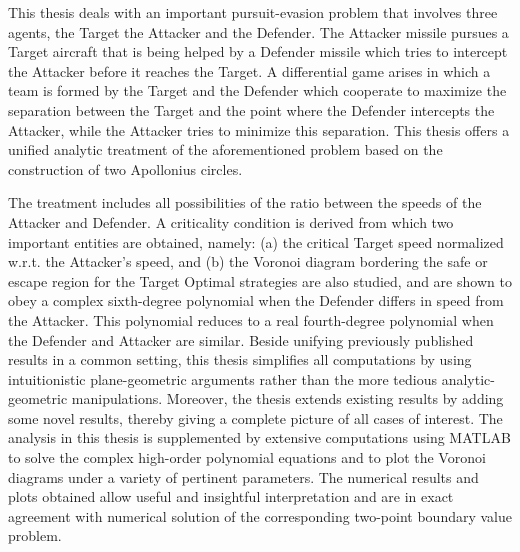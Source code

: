 This thesis deals with an important pursuit-evasion problem that involves three agents, the Target the Attacker and the Defender. The Attacker missile pursues a Target aircraft that is being helped by a Defender missile which tries to intercept the Attacker before it reaches the Target. A differential game arises in which a team is formed by the Target and the Defender which cooperate to maximize the separation between the Target and the point where the Defender intercepts the Attacker, while the Attacker tries to minimize this separation. This thesis offers a unified analytic treatment of the aforementioned problem based on the construction of two Apollonius circles.

The treatment includes all possibilities of the ratio between the speeds of the Attacker and Defender. A criticality condition is derived from which two important entities are obtained, namely: (a) the critical Target speed normalized w.r.t. the Attacker's speed, and (b) the Voronoi diagram bordering the safe or escape region for the Target
Optimal strategies are also studied, and are shown to obey a complex sixth-degree polynomial when the Defender differs in speed from the Attacker. This polynomial reduces to a real fourth-degree polynomial when the Defender and Attacker are similar.
Beside unifying previously published results in a common setting, this thesis simplifies all computations by using intuitionistic plane-geometric arguments rather than the more tedious analytic-geometric manipulations. 
Moreover, the thesis extends existing results by adding some novel results, thereby giving a complete picture of all cases of interest.
The analysis in this thesis is supplemented by extensive computations using MATLAB to solve the complex high-order polynomial equations and to plot the Voronoi diagrams under a variety of pertinent parameters.
The numerical results and plots obtained allow useful and insightful interpretation and are in exact agreement with numerical solution of the corresponding two-point boundary value problem.